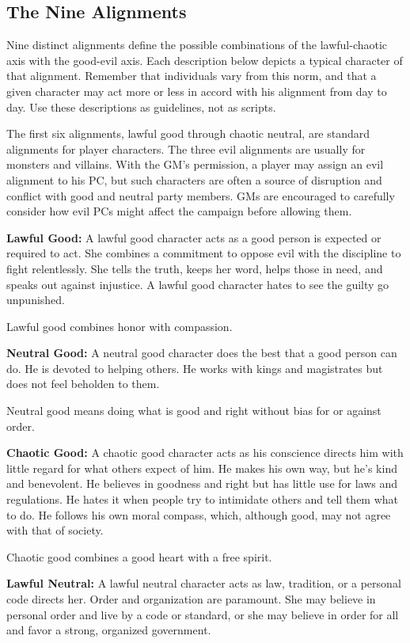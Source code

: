 \subsection{The Nine Alignments}

				
Nine distinct alignments define the possible combinations of the lawful-chaotic axis with the good-evil axis. Each description below depicts a typical character of that alignment. Remember that individuals vary from this norm, and that a given character may act more or less in accord with his alignment from day to day. Use these descriptions as guidelines, not as scripts.
				
The first six alignments, lawful good through chaotic neutral, are standard alignments for player characters. The three evil alignments are usually for monsters and villains. With the GM's permission, a player may assign an evil alignment to his PC, but such characters are often a source of disruption and conflict with good and neutral party members. GMs are encouraged to carefully consider how evil PCs might affect the campaign before allowing them.
				
\textbf{Lawful Good:} A lawful good character acts as a good person is expected or required to act. She combines a commitment to oppose evil with the discipline to fight relentlessly. She tells the truth, keeps her word, helps those in need, and speaks out against injustice. A lawful good character hates to see the guilty go unpunished.
				
Lawful good combines honor with compassion.
				
\textbf{Neutral Good:} A neutral good character does the best that a good person can do. He is devoted to helping others. He works with kings and magistrates but does not feel beholden to them.
				
Neutral good means doing what is good and right without bias for or against order.
				
\textbf{Chaotic Good:} A chaotic good character acts as his conscience directs him with little regard for what others expect of him. He makes his own way, but he's kind and benevolent. He believes in goodness and right but has little use for laws and regulations. He hates it when people try to intimidate others and tell them what to do. He follows his own moral compass, which, although good, may not agree with that of society.
				
Chaotic good combines a good heart with a free spirit.
				
\textbf{Lawful Neutral:} A lawful neutral character acts as law, tradition, or a personal code directs her. Order and organization are paramount. She may believe in personal order and live by a code or standard, or she may believe in order for all and favor a strong, organized government.
				
